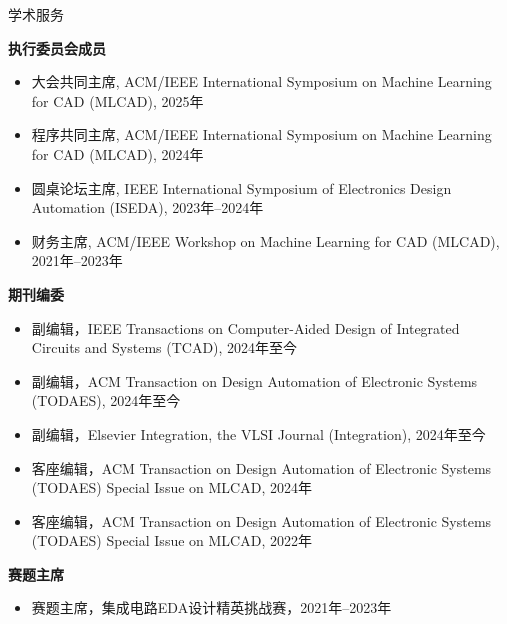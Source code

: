 
\begin{rSection}{学术服务}

\textbf{执行委员会成员}
\begin{itemize}
    \item 大会共同主席, ACM/IEEE International Symposium on Machine Learning for CAD (MLCAD), 2025年
    \item 程序共同主席, ACM/IEEE International Symposium on Machine Learning for CAD (MLCAD), 2024年
    \item 圆桌论坛主席, IEEE International Symposium of Electronics Design Automation (ISEDA), 2023年--2024年
    \item 财务主席, ACM/IEEE Workshop on Machine Learning for CAD (MLCAD), 2021年--2023年 
\end{itemize}

\textbf{期刊编委}
\begin{itemize}
    \item 副编辑，IEEE Transactions on Computer-Aided Design of Integrated Circuits and Systems (TCAD), 2024年至今
    \item 副编辑，ACM Transaction on Design Automation of Electronic Systems (TODAES), 2024年至今
    \item 副编辑，Elsevier Integration, the VLSI Journal (Integration), 2024年至今
    \item 客座编辑，ACM Transaction on Design Automation of Electronic Systems (TODAES) Special Issue on MLCAD, 2024年
    \item 客座编辑，ACM Transaction on Design Automation of Electronic Systems (TODAES) Special Issue on MLCAD, 2022年
\end{itemize}

\textbf{赛题主席}
\begin{itemize}
    \item 赛题主席，集成电路EDA设计精英挑战赛，2021年--2023年
\end{itemize}


\end{rSection}
